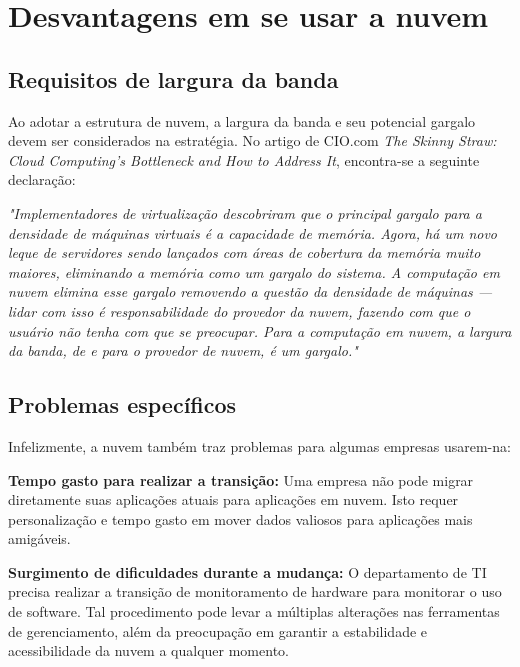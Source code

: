 \section{Desvantagens em se usar a nuvem}

\subsection{Requisitos de largura da banda}

Ao adotar a estrutura de nuvem, a largura da banda e seu potencial gargalo devem ser
considerados na estratégia. No artigo de CIO.com \emph{The Skinny Straw: Cloud
Computing's Bottleneck and How to Address It}, encontra-se a seguinte declaração:

\begin{displayquote}
\emph{
    "Implementadores de virtualização descobriram que o principal gargalo para a 
    densidade de máquinas virtuais é a capacidade de memória. Agora, há um novo
    leque de servidores sendo lançados com áreas de cobertura da memória muito
    maiores, eliminando a memória como um gargalo do sistema. A computação em nuvem
    elimina esse gargalo removendo a questão da densidade de máquinas --- lidar com
    isso é responsabilidade do provedor da nuvem, fazendo com que o usuário não tenha
    com que se preocupar.
    Para a computação em nuvem, a largura da banda, de e para o provedor de nuvem,
    é um gargalo."
}
\end{displayquote}

\subsection{Problemas específicos}

Infelizmente, a nuvem também traz problemas para algumas empresas usarem-na:

\newcommand{\itemm}[1]{\item\textbf{#1}}

\begin{itemise}

    \itemm{Tempo gasto para realizar a transição:} Uma empresa não pode migrar
    diretamente suas aplicações atuais para aplicações em nuvem. Isto requer
    personalização e tempo gasto em mover dados valiosos para aplicações mais
    amigáveis.

    \itemm{Surgimento de dificuldades durante a mudança:} O departamento de TI
    precisa realizar a transição de monitoramento de hardware para monitorar o uso
    de software. Tal procedimento pode levar a múltiplas alterações nas ferramentas de
    gerenciamento, além da preocupação em garantir a estabilidade e acessibilidade
    da nuvem a qualquer momento.

\end{itemise}

\undef\itemm
